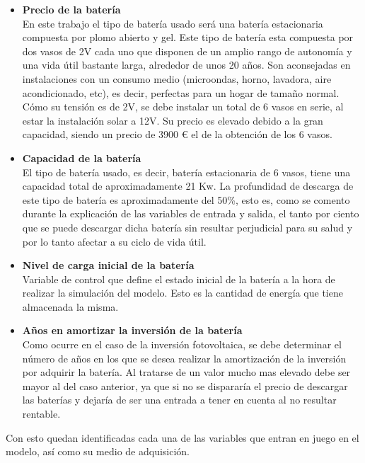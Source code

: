 \begin{itemize}
	\item \textbf{Precio de la batería}\\ En este trabajo el tipo de batería usado será una batería estacionaria compuesta por plomo abierto y gel. Este tipo de batería esta compuesta por dos vasos de 2V cada uno que disponen de un amplio rango de autonomía y una vida útil bastante larga, alrededor de unos 20 años. Son aconsejadas en instalaciones con un consumo medio (microondas, horno, lavadora, aire acondicionado, etc), es decir, perfectas para un hogar de tamaño normal. Cómo su tensión es de 2V, se debe instalar un total de 6 vasos en serie, al estar la instalación solar a 12V. Su precio es elevado debido a la gran capacidad, siendo un precio de 3900 € el de la obtención de los 6 vasos.
	\item \textbf{Capacidad de la batería}\\ El tipo de batería usado, es decir, batería estacionaria de 6 vasos, tiene una capacidad total de aproximadamente 21 Kw. La profundidad de descarga de este tipo de batería es aproximadamente del 50\%, esto es, como se comento durante la explicación de las variables de entrada y salida, el tanto por ciento que se puede descargar dicha batería sin resultar perjudicial para su salud y por lo tanto afectar a su ciclo de vida útil.
	\item \textbf{Nivel de carga inicial de la batería}\\ Variable de control que define el estado inicial de la batería a la hora de realizar la simulación del modelo. Esto es la cantidad de energía que tiene almacenada la misma.
	\item \textbf{Años en amortizar la inversión de la batería}\\ Como ocurre en el caso de la inversión fotovoltaica, se debe determinar el número de años en los que se desea realizar la amortización de la inversión por adquirir la batería. Al tratarse de un valor mucho mas elevado debe ser mayor al del caso anterior, ya que si no se dispararía el precio de descargar las baterías y dejaría de ser una entrada a tener en cuenta al no resultar rentable.
\end{itemize}
Con esto quedan identificadas cada una de las variables que entran en juego en el modelo, así como su medio de adquisición.
